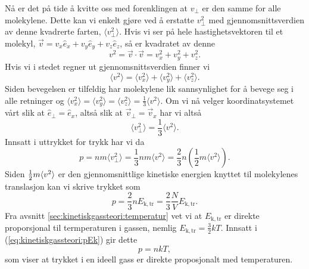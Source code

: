 Nå er det på tide å kvitte oss med forenklingen at $v_\perp$ er den samme for alle molekylene. Dette kan vi enkelt gjøre ved å erstatte $v_\perp^2$ med gjennomsnittsverdien av denne kvadrerte farten, $\langle v_\perp^2\rangle$. Hvis vi ser på hele hastighetsvektoren til et molekyl, $\vec{v} = v_x \hat{e}_x +  v_y \hat{e}_y +  v_z \hat{e}_z$, så er kvadratet av denne
\begin{displaymath}
	v^2 = \vec{v}\cdot\vec{v} = v_x^2 + v_y^2+v_z^2.
\end{displaymath}
Hvis vi i stedet regner ut gjennomsnittsverdien finner vi
\begin{displaymath}
	\langle v^2\rangle =\langle v_x^2\rangle +\langle v_y^2\rangle + \langle v_z^2\rangle.
\end{displaymath}
Siden bevegelsen er tilfeldig har molekylene lik sannsynlighet for å bevege seg i alle retninger og $\langle v_x^2\rangle = \langle v_y^2\rangle = \langle v_z^2\rangle = \frac{1}{3}\langle v^2\rangle$. Om vi nå velger koordinatsystemet vårt slik at $\hat{e}_\perp = \hat{e}_x$, altså slik at $\vec{v}_\perp = \vec{v}_x$ har vi altså
\begin{displaymath}
	\langle v_\perp^2 \rangle =\frac{1}{3}\langle v^2 \rangle.
\end{displaymath}
Innsatt i uttrykket for trykk har vi da
\begin{displaymath}
	p = nm\langle v_\perp^2 \rangle = \frac{1}{3}nm\langle v^2 \rangle = \frac{2}{3}n\left(\frac{1}{2}m\langle v^2 \rangle\right).
\end{displaymath}
Siden $\frac{1}{2} m\langle v^2\rangle$ er den gjennomsnittlige kinetiske energien knyttet til molekylenes translasjon kan vi skrive trykket som
\begin{equation}
	\label{eq:kinetiskgassteori:pEk}
	p = \frac{2}{3}nE_\mathrm{k,tr} = \frac{2}{3}\frac{N}{V}E_\mathrm{k,tr}.
\end{equation}
Fra avsnitt \ref{sec:kinetiskgassteori:temperatur} vet vi at $E_\mathrm{k,tr}$ er direkte proporsjonal til termperaturen i gassen, nemlig $E_\mathrm{k,tr} = \frac{3}{2}kT$. Innsatt i (\ref{eq:kinetiskgassteori:pEk}) gir dette
\begin{displaymath}
	p = nkT,
\end{displaymath}
som viser at trykket i en ideell gass er direkte proposjonalt med temperaturen.


